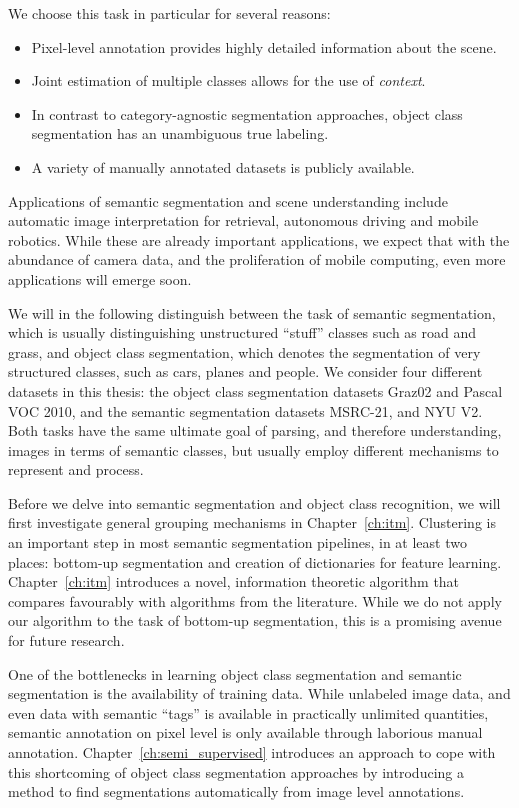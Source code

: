 We choose this task in particular for several reasons:
\begin{itemize}
    \item Pixel-level annotation provides highly detailed information about the scene.
    \item Joint estimation of multiple classes allows for the use of \emph{context}.
    \item In contrast to category-agnostic segmentation approaches, object class segmentation
        has an unambiguous true labeling.
    \item A variety of manually annotated datasets is publicly available.
\end{itemize}
%
Applications of semantic segmentation and scene understanding include automatic
image interpretation for retrieval, autonomous driving and mobile robotics.
While these are already important applications, we expect that with the
abundance of camera data, and the proliferation of mobile computing, even
more applications will emerge soon.

We will in the following distinguish between the task of semantic segmentation,
which is usually distinguishing unstructured ``stuff'' classes such as road and
grass, and object class segmentation, which denotes the segmentation of very
structured classes, such as cars, planes and people.
We consider four different datasets in this thesis: the object class segmentation
datasets Graz02 and Pascal VOC 2010, and the semantic segmentation datasets MSRC-21,
and NYU V2.
%
Both tasks have the same ultimate goal of parsing, and therefore understanding, images
in terms of semantic classes, but usually employ  different mechanisms to represent and process.

Before we delve into semantic segmentation and object class recognition, we
will first investigate general grouping mechanisms in Chapter~\ref{ch:itm}.
Clustering is an important step in most semantic segmentation pipelines, in at
least two places: bottom-up segmentation and creation of dictionaries for
feature learning. Chapter~\ref{ch:itm} introduces a novel, information theoretic
algorithm that compares favourably with algorithms from the literature.
While we do not apply our algorithm to the task of bottom-up segmentation,
this is a promising avenue for future research.

One of the bottlenecks in learning object class segmentation and semantic
segmentation is the availability of training data.  While unlabeled image data,
and even data with semantic
``tags'' is available in practically unlimited quantities, semantic annotation
on pixel level is only available through laborious manual annotation. 
Chapter~\ref{ch:semi_supervised} introduces an approach to cope with this
shortcoming of object class segmentation approaches by introducing a method to
find segmentations automatically from image level annotations.

